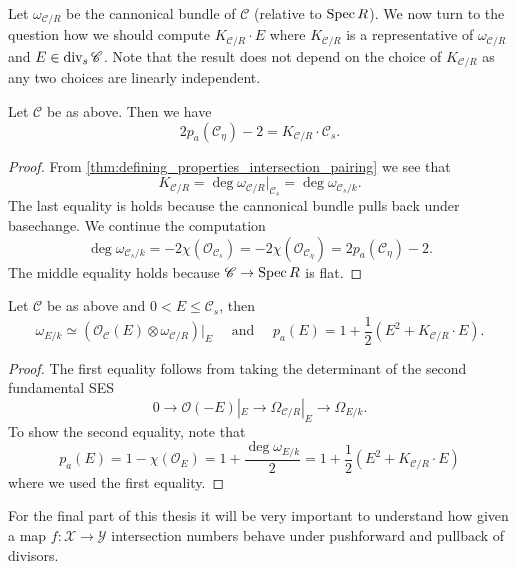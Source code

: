 Let $\omega_{\mathscr C / R} $ be the cannonical bundle of $\mathscr C$ (relative to $\operatorname{Spec} R$).
We now turn to the question how we should compute $K_{\mathscr C / R} \cdot E$ where  $K_{\mathscr C / R}$ is a representative of $\omega_{\mathscr C / R}$ and $E \in \operatorname{div}_s \mathscr C$. 
Note that the result does not depend on the choice of $K_{\mathscr C / R}$ as any two choices are linearly independent. 

\begin{proposition}
	Let $\mathscr C$ be as above. 
	Then we have \[
		2p_a(\mathscr C_\eta) - 2 = K_{\mathscr C / R} \cdot \mathscr C_s  
	.\] 
\end{proposition}
\begin{proof}
	From \cref{thm:defining_properties_intersection_pairing} we see that \[
		K_{\mathscr C / R} = \deg \omega_{\mathscr C / R}|_{\mathscr C_s} = \deg \omega _{\mathscr C_s / k}
	.\] 
	The last equality is holds because the cannonical bundle pulls back under basechange. 
	We continue the computation \[
		\deg \omega_{\mathscr C_s / k} = - 2\chi (\mathcal{O}_{\mathscr C_s}) = -2 \chi (\mathcal{O}_{\mathscr C_\eta}) = 2p_a(\mathscr C_\eta) - 2
	.\] 
	The middle equality holds because $\mathscr C \to \operatorname{Spec} R$ is flat. 
\end{proof}

\begin{theorem}\label{thm:adjunction_formula}
	Let $\mathscr C$ be as above and $0 < E \le \mathscr C_s$, then \[
		\omega_{E / k} \simeq (\mathcal{O}_{\mathscr C}(E) \otimes \omega_{\mathscr C / R})|_E \quad \text{ and } \quad p_a(E) = 1 + \frac{1}{2}(E^2 + K_{\mathscr C / R}\cdot E)
	.\] 
\end{theorem}
\begin{proof}
	The first equality follows from taking the determinant of the second fundamental SES  \[
		0 \to \mathcal{O}(-E)|_E \to \Omega_{\mathscr C / R}|_E \to \Omega_{E / k}
	.\] 
	To show the second equality, note that \[
		p_a(E) = 1 - \chi(\mathcal{O}_E) = 1  + \frac{\deg \omega_{E / k}}{2} = 1 + \frac{1}{2}\left(E^2 + K_{\mathscr C / R} \cdot E\right)
	\] 
	where we used the first equality. 
\end{proof}


For the final part of this thesis it will be very important to understand how given a map $f: \mathscr X \to \mathscr Y$ intersection numbers behave under pushforward and pullback of divisors. 

